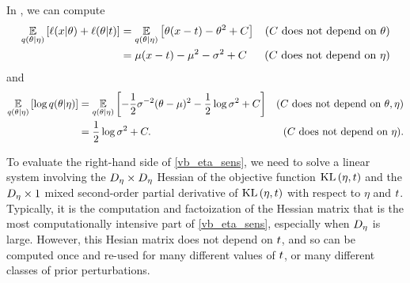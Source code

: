 \begin{ex}
%
In , we can compute
%
\begin{align*}
%
\expect{\q(\theta \vert \eta)}
       {\logp(\x \vert \theta) + \logp(\theta \vert \t)} ={}&
\expect{\q(\theta \vert \eta)}{\theta(\x - \t) - \theta^2 + \const}
    & \constdesc{\theta}
\\={}&
\mu (\x - \t) - \mu^2 - \sigma^2  + \const & \constdesc{\eta} \\
%
\end{align*}
%
and
%
\begin{align*}
%
\expect{\q(\theta \vert \eta)}{\log \q(\theta \vert \eta)} ={}&
\expect{\q(\theta \vert \eta)}
       {-\frac{1}{2} \sigma^{-2} (\theta - \mu)^2 -\frac{1}{2} \log \sigma^2 +
        \const} &\constdesc{\theta, \eta}
\\={}& \frac{1}{2} \log \sigma^2 + \const. &\constdesc{\eta}.
%
\end{align*}
%


%
\end{ex}



To evaluate the right-hand side of \eqref{vb_eta_sens}, we need to solve a
linear system involving the $D_{\eta} \times D_{\eta}$ Hessian of the objective
function $\mathrm{KL}\left(\eta, t\right)$ and the $D_{\eta} \times 1$ mixed second-order partial
derivative of $\mathrm{KL}\left(\eta, t\right)$ with respect to $\eta$ and $t$.  Typically, it is
the computation and factoization of the Hessian matrix that is the most
computationally intensive part of \eqref{vb_eta_sens}, especially when $D_{\eta}$
is large.  However, this Hesian matrix does not depend on $t$, and so can be
computed once and re-used for many different values of $t$, or many different
classes of prior perturbations.

%
